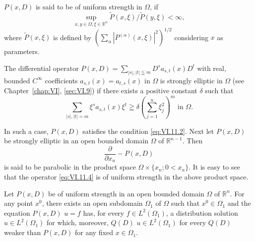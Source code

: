 \begin{definitionu} $P(x, D)$ is said to be of uniform strength in $\Omega$, if 
\begin{equation}\label{eq:VI.11.2}
\sup\limits _ {x, y \in \Omega , \xi \in \mathbb{R}^{n}} \tilde {P} (x, \xi) / \tilde {P} (y, \xi) < \infty ,
\end{equation}
where $\tilde{P}(x, \xi)$ is defined by $\left(\sum\limits_{\alpha} |P^{(\alpha)}(x, \xi)|^2\right)^{1/2}$ considering $x$ as parameters. 
\end{definitionu}

\begin{examplen} The differential operator $P(x, D) = \sum\limits_{|s|, |t| \leqq m} D^{s} a_{s,t}(x) D^{t}$ with real, bounded $C^{\infty}$ coefficients $a_{s,t}(x) = a_{t,s}(x)$ in $\Omega$ is strongly elliptic in $\Omega$ (see Chapter~\ref{chap:VI}, \ref{sec:VI.9}) if there exists a positive constant $\delta$ such that
\begin{equation}\label{eq:VI.11.3}
\sum\limits_{|s|,|t|=m} \xi^{s} a _{s,t} (x) \xi^{t} \geqq \delta \left(\sum\limits_{j=1} ^{n} \xi_{j} ^{2}\right) ^{m} \text{ in } \Omega .
\end{equation}

In such a case, $P(x, D)$ satisfies the condition \eqref{eq:VI.11.2}. Next let $P(x, D)$ be strongly elliptic in an open bounded domain $\Omega$ of $\mathbb{R}^{n-1}$. Then 
\begin{equation}\label{eq:VI.11.4}
\frac {\partial}{\partial x _{n}} - P (x, D)
\end{equation}
is said to be parabolic in the product space $\Omega\times\{x_{n};0<x_{n}\}$. It is easy to see that the operator \eqref{eq:VI.11.4} is of uniform strength in the above product space. 

\end{examplen}
\begin{theoremn} Let $P(x, D)$ be of uniform strength in an open bounded domain $\Omega$ of $\mathbb{R}^{n}$. For any point $x^0$, there exists an open subdomain $\Omega_1$ of $\Omega$ such that $x^0 \in \Omega_1$ and the equation $P(x, D)$ $u = f$ has, for every $f \in L^2(\Omega_1)$, a distribution solution $u \in L^2(\Omega_1)$ for which, moreover, $Q(D)$ $u \in L^2(\Omega_1)$ for every $Q(D)$ weaker than $P(x, D)$ for any fixed $x \in \Omega_1$.

\end{theoremn}
